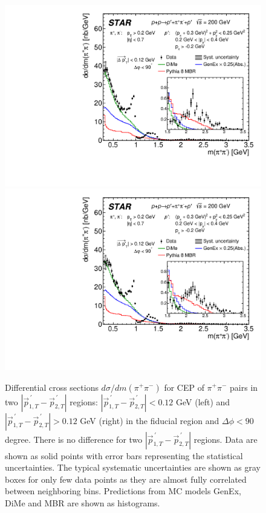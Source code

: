 \begin{figure}[h]
\centering
\hspace*{5pt}
\includegraphics[width=.46\textwidth,page=1]{graphics/physicsResults/FinalResult_InvMass_pion_SmallDpt_DeltaPhiLessThan90.pdf}
\hfill
\includegraphics[width=.46\textwidth,page=1]{graphics/physicsResults/FinalResult_InvMass_pion_LargeDpt_DeltaPhiLessThan90.pdf}
\hspace*{5pt}
%
\caption[Differential cross sections $d\sigma/dm(\pi^+\pi^-)$ for CEP of $\pi^+\pi^-$ pairs in two $|\vec{p}_{1,T}^{\,\prime}-\vec{p}_{2,T}^{\,\prime}|$ regions: $|\vec{p}_{1,T}^{\,\prime}-\vec{p}_{2,T}^{\,\prime}|<0.12$ GeV and $|\vec{p}_{1,T}^{\,\prime}-\vec{p}_{2,T}^{\,\prime}|>0.12$ GeV in the fiducial region and $\Delta\phi<90$ degree.]{Differential cross sections $d\sigma/dm(\pi^+\pi^-)$ for CEP of $\pi^+\pi^-$ pairs in two $|\vec{p}_{1,T}^{\,\prime}-\vec{p}_{2,T}^{\,\prime}|$ regions: $|\vec{p}_{1,T}^{\,\prime}-\vec{p}_{2,T}^{\,\prime}|<0.12$ GeV (left) and $|\vec{p}_{1,T}^{\,\prime}-\vec{p}_{2,T}^{\,\prime}|>0.12$ GeV (right)  in the fiducial region and $\Delta\phi<90$ degree. There is no difference for two $|\vec{p}_{1,T}^{\,\prime}-\vec{p}_{2,T}^{\,\prime}|$ regions. Data are shown as solid points with error bars representing the statistical uncertainties. The typical systematic uncertainties are shown as gray boxes for only few data points as they are almost fully correlated between neighboring bins. Predictions from MC models GenEx, DiMe and MBR are shown as histograms.}
\label{results_5}
\end{figure}



